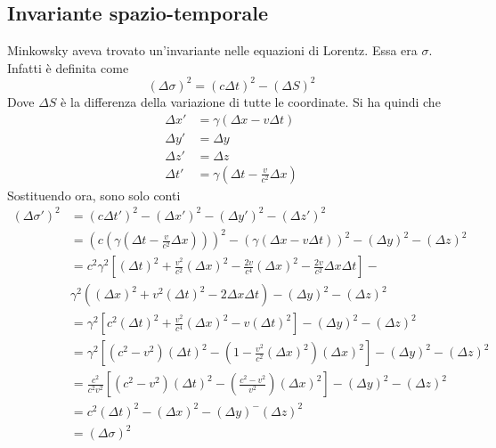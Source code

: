 \subsection{Invariante spazio-temporale}
Minkowsky aveva trovato un'invariante nelle equazioni di Lorentz. Essa era $\sigma$. Infatti è
definita come
\begin{equation*}
  {(\Delta\sigma)}^2={(c\Delta t)}^2-{(\Delta S)}^2
\end{equation*}
Dove $\Delta S$ è la differenza della variazione di tutte le coordinate. Si ha quindi che
\begin{align*}
  \Delta x' &= \gamma(\Delta x-v\Delta t)\\
  \Delta y' &= \Delta y\\
  \Delta z' &= \Delta z\\
  \Delta t' &= \gamma \left( \Delta t-\frac{v}{c^2}\Delta x \right)
\end{align*}
Sostituendo ora, sono solo conti
\begin{align*}
  {(\Delta\sigma')}^2 &= {(c\Delta t')}^2-{(\Delta x')}^2-{(\Delta y')}^2-{(\Delta z')}^2\\
                      &= {\left(c\left(\gamma \left( \Delta t-\frac{v}{c^2}\Delta x \right)\right)
                      \right)}^2-
  {\left( \gamma \left( \Delta x-v\Delta t \right) \right)}^2-{(\Delta y)}^2-{(\Delta z)}^2\\
  &= c^2\gamma^2 \left[ {(\Delta t)}^2+\frac{v^2}{c^2}{(\Delta x)}^2-\frac{2v}{c^4}{(\Delta x)}^2 -
  \frac{2v}{c^2}\Delta x\Delta t\right]-\\
  &\gamma^2({(\Delta x)}^2+v^2{(\Delta t)}^2-2\Delta x\Delta t)-{(\Delta y)}^2-{(\Delta z)}^2\\
  &=\gamma^2 \left[ c^2{(\Delta t)}^2+\frac{v^2}{c^4}{(\Delta x)}^2-v{(\Delta t)}^2 \right]-
  {(\Delta y)}^2-{(\Delta z)}^2\\
  &=\gamma^2 \left[ (c^2-v^2){(\Delta t)}^2-\left( 1-\frac{v^2}{c^2}
  {(\Delta x)}^2 \right){(\Delta x)}^2 \right]-{(\Delta y)}^2-
  {(\Delta z)}^2\\
  &=\frac{c^2}{c^2v^2}\left[ (c^2-v^2){(\Delta t)}^2-\left( \frac{c^2-v^2}{v^2}
  \right){(\Delta x)}^2 \right]-{(\Delta y)}^2-{(\Delta z)}^2\\
  &=c^2{(\Delta t)}^2-{(\Delta x)}^2-{(\Delta y)}^-{(\Delta z)}^2\\
  &={(\Delta\sigma)}^2
\end{align*}

